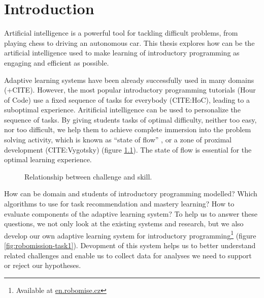 \chapter{Introduction}
\label{chap:introduction}

Artificial intelligence is a powerful tool for tackling difficult problems,
from playing chess to driving an autonomous car.
This thesis explores how can be the artificial intelligence used to make
learning of introductory programming as engaging and efficient as possible.

Adaptive learning systems have been already successfully used in many domains
\cite{alg.evaluation-geography} (+CITE).
However, the most popular introductory programming tutorials (Hour of Code) use
a fixed sequence of tasks for everybody (CITE:HoC), leading to a suboptimal experience.
Aritificial intelligence can be used to personalize the sequence of tasks.
By giving students tasks of optimal difficulty, neither too easy, nor too
difficult, we help them to achieve complete immersion into the problem solving
activity, which is known as ``state of flow'' \cite{flow},
or a zone of proximal development (CITE:Vygotsky) (figure \ref{fig:flow}).
The state of flow is essential for the optimal learning experience.

\begin{figure}[htb]
  \centering
  \caption{Relationship between challenge and skill.}
  \label{fig:flow}
\end{figure}


How can be domain and students of introductory programming modelled?
Which algorithms to use for task recommendation and mastery learning?
How to evaluate components of the adaptive learning system?
To help us to answer these questions, we not only look at the existing systems
and research, but we also develop our own adaptive learning system for
introductory programming\footnote{Available at \url{en.robomise.cz}}
(figure \ref{fig:robomission-task1}).
Devopment of this system helps us to better understand related challenges
and enable us to collect data for analyses we need to support or reject our hypotheses.

